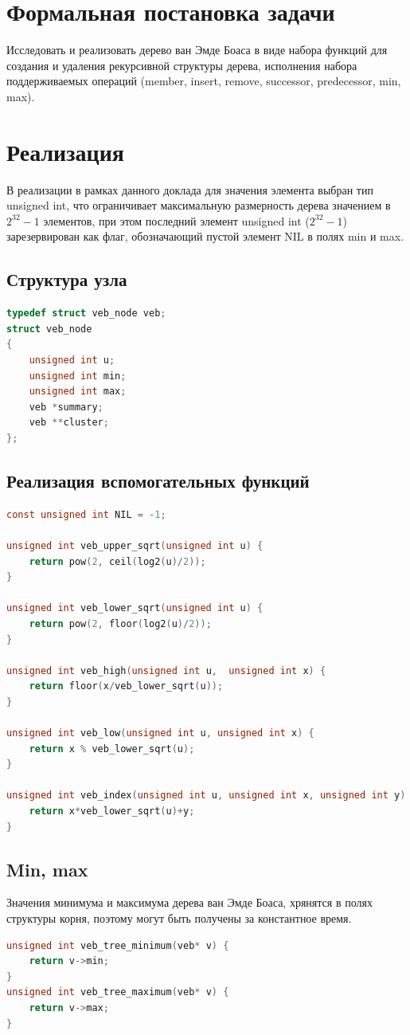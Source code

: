\documentclass{article}
\begin{document}
\section{Формальная постановка задачи}
Исследовать и реализовать дерево ван Эмде Боаса в виде набора функций для создания и удаления рекурсивной структуры дерева, исполнения набора поддерживаемых операций (member, insert, remove, successor, predecessor, min, max).
\section{Реализация}
В реализации в рамках данного доклада для значения элемента выбран тип unsigned int, что ограничивает максимальную размерность дерева значением в $2^{32}-1$ элементов, при этом последний элемент unsigned int ($2^{32}-1$) зарезервирован как флаг, обозначающий пустой элемент NIL в полях min и max.
\subsection{Структура узла}
\begin{lstlisting}[language=C,style=C]
typedef struct veb_node veb;
struct veb_node
{
    unsigned int u;
    unsigned int min;
    unsigned int max;
    veb *summary;
    veb **cluster;
};
\end{lstlisting}
\subsection{Реализация вспомогательных функций}
\begin{lstlisting}[language=C,style=C]
const unsigned int NIL = -1;

unsigned int veb_upper_sqrt(unsigned int u) {
    return pow(2, ceil(log2(u)/2));
}

unsigned int veb_lower_sqrt(unsigned int u) {
    return pow(2, floor(log2(u)/2));
}

unsigned int veb_high(unsigned int u,  unsigned int x) {
    return floor(x/veb_lower_sqrt(u));
}

unsigned int veb_low(unsigned int u, unsigned int x) {
    return x % veb_lower_sqrt(u);
}

unsigned int veb_index(unsigned int u, unsigned int x, unsigned int y) {
    return x*veb_lower_sqrt(u)+y;
}
\end{lstlisting}
\subsection{Min, max}
Значения минимума и максимума дерева ван Эмде Боаса, хрянятся в полях структуры корня, поэтому могут быть получены за константное время.
\begin{lstlisting}[language=C,style=C]
unsigned int veb_tree_minimum(veb* v) {
    return v->min;
}
unsigned int veb_tree_maximum(veb* v) {
    return v->max;
}
\end{lstlisting}
\end{document}
